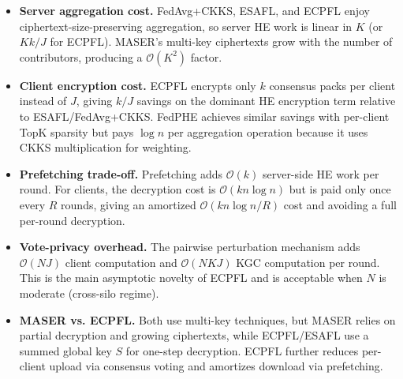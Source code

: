 \documentclass[a4paper,11pt]{article}
\begin{document}
\begin{itemize}
    \item \textbf{Server aggregation cost.} FedAvg+CKKS, ESAFL, and ECPFL enjoy ciphertext-size-preserving aggregation, so server HE work is linear in $K$ (or $Kk/J$ for ECPFL). MASER's multi-key ciphertexts grow with the number of contributors, producing a $\mathcal{O}(K^2)$ factor.
    \item \textbf{Client encryption cost.} ECPFL encrypts only $k$ consensus packs per client instead of $J$, giving $k/J$ savings on the dominant HE encryption term relative to ESAFL/FedAvg+CKKS. FedPHE achieves similar savings with per-client TopK sparsity but pays $\log n$ per aggregation operation because it uses CKKS multiplication for weighting.
    \item \textbf{Prefetching trade-off.} Prefetching adds $\mathcal{O}(k)$ server-side HE work per round. For clients, the decryption cost is $\mathcal{O}(k n\log n)$ but is paid only once every $R$ rounds, giving an amortized $\mathcal{O}(k n\log n/R)$ cost and avoiding a full per-round decryption.
    \item \textbf{Vote-privacy overhead.} The pairwise perturbation mechanism adds $\mathcal{O}(NJ)$ client computation and $\mathcal{O}(NKJ)$ KGC computation per round. This is the main asymptotic novelty of ECPFL and is acceptable when $N$ is moderate (cross-silo regime).
    \item \textbf{MASER vs. ECPFL.} Both use multi-key techniques, but MASER relies on partial decryption and growing ciphertexts, while ECPFL/ESAFL use a summed global key $S$ for one-step decryption. ECPFL further reduces per-client upload via consensus voting and amortizes download via prefetching.
\end{itemize}
\end{document}
